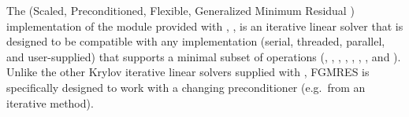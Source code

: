 
The {\spfgmr} (Scaled, Preconditioned, Flexible, Generalized Minimum
Residual \cite{Saa:93}) implementation of the {\sunlinsol} module
provided with {\sundials}, {\sunlinsolspfgmr}, is an iterative linear
solver that is designed to be compatible with any {\nvector}
implementation (serial, threaded, parallel, and user-supplied) that
supports a minimal subset of operations (,
, , , ,
, , and ).  Unlike the other
Krylov iterative linear solvers supplied with {\sundials}, FGMRES is
specifically designed to work with a changing preconditioner
(e.g.~from an iterative method).

